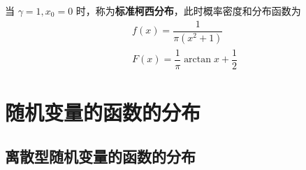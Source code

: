 当 $\gamma = 1, x_0 = 0$ 时，称为\textbf{标准柯西分布}，此时概率密度和分布函数为
$$
\begin{aligned}
    & f(x) = \dfrac{1}{\pi(x^2 + 1)} \\
    & F(x) = \dfrac{1}{\pi} \arctan x + \dfrac{1}{2}
\end{aligned}
$$

\section{随机变量的函数的分布}

\subsection{离散型随机变量的函数的分布}




    
